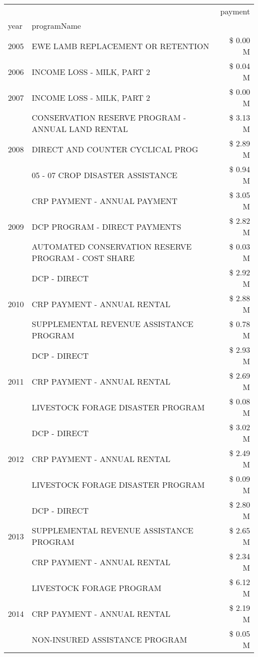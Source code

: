 \begin{tabular}{llr}
\toprule
 &  & payment \\
year & programName &  \\
\midrule
2005 & EWE LAMB REPLACEMENT OR RETENTION & \$ 0.00 M \\
\cline{1-3}
2006 & INCOME LOSS - MILK, PART 2 & \$ 0.04 M \\
\cline{1-3}
2007 & INCOME LOSS - MILK, PART 2 & \$ 0.00 M \\
\cline{1-3}
\multirow[t]{3}{*}{2008} & CONSERVATION RESERVE PROGRAM - ANNUAL LAND RENTAL & \$ 3.13 M \\
 & DIRECT AND COUNTER CYCLICAL PROG & \$ 2.89 M \\
 & 05 - 07 CROP DISASTER ASSISTANCE & \$ 0.94 M \\
\cline{1-3}
\multirow[t]{3}{*}{2009} & CRP PAYMENT - ANNUAL PAYMENT & \$ 3.05 M \\
 & DCP PROGRAM - DIRECT PAYMENTS & \$ 2.82 M \\
 & AUTOMATED CONSERVATION RESERVE PROGRAM - COST SHARE & \$ 0.03 M \\
\cline{1-3}
\multirow[t]{3}{*}{2010} & DCP - DIRECT & \$ 2.92 M \\
 & CRP PAYMENT - ANNUAL RENTAL & \$ 2.88 M \\
 & SUPPLEMENTAL REVENUE ASSISTANCE PROGRAM & \$ 0.78 M \\
\cline{1-3}
\multirow[t]{3}{*}{2011} & DCP - DIRECT & \$ 2.93 M \\
 & CRP PAYMENT - ANNUAL RENTAL & \$ 2.69 M \\
 & LIVESTOCK FORAGE DISASTER PROGRAM & \$ 0.08 M \\
\cline{1-3}
\multirow[t]{3}{*}{2012} & DCP - DIRECT & \$ 3.02 M \\
 & CRP PAYMENT - ANNUAL RENTAL & \$ 2.49 M \\
 & LIVESTOCK FORAGE DISASTER PROGRAM & \$ 0.09 M \\
\cline{1-3}
\multirow[t]{3}{*}{2013} & DCP - DIRECT & \$ 2.80 M \\
 & SUPPLEMENTAL REVENUE ASSISTANCE PROGRAM & \$ 2.65 M \\
 & CRP PAYMENT - ANNUAL RENTAL & \$ 2.34 M \\
\cline{1-3}
\multirow[t]{3}{*}{2014} & LIVESTOCK FORAGE PROGRAM & \$ 6.12 M \\
 & CRP PAYMENT - ANNUAL RENTAL & \$ 2.19 M \\
 & NON-INSURED ASSISTANCE PROGRAM & \$ 0.05 M \\
\cline{1-3}

\end{tabular}
